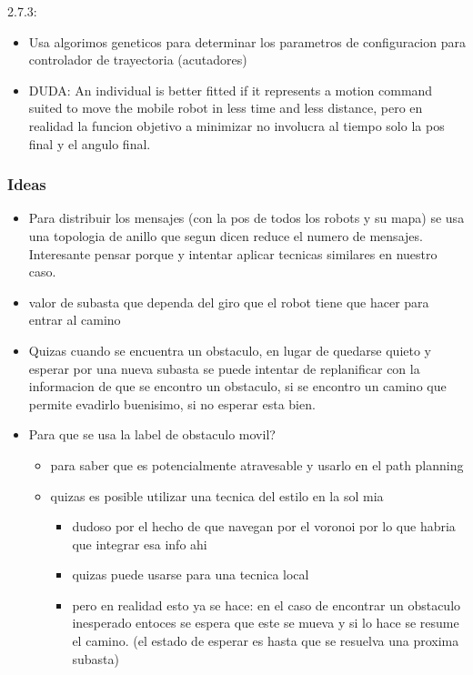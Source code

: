 2.7.3:
\begin{itemize}
\item Usa algorimos geneticos para determinar los parametros de configuracion para controlador de trayectoria (acutadores)
\item DUDA: An individual is better fitted if it represents a motion command suited to move the mobile robot in less time and less distance, pero en realidad la funcion objetivo a minimizar no involucra al tiempo solo la pos final y el angulo final.
\end{itemize}


\subsubsection{Ideas}
\begin{itemize}
\item Para distribuir los mensajes (con la pos de todos los robots y su mapa) se usa una topologia de anillo que segun dicen reduce el numero de mensajes. Interesante pensar porque y intentar aplicar tecnicas similares en nuestro caso.

\item valor de subasta que dependa del giro que el robot tiene que hacer para entrar al camino

\item Quizas cuando se encuentra un obstaculo, en lugar de quedarse quieto y esperar por una nueva subasta se puede intentar de replanificar con la informacion de que se encontro un obstaculo, si se encontro un camino que permite evadirlo buenisimo, si no esperar esta bien.

\item Para que se usa la label de obstaculo movil?
\begin{itemize}
  \item para saber que es potencialmente atravesable y usarlo en el path planning
  \item quizas es posible utilizar una tecnica del estilo en la sol mia
  \begin{itemize}
    \item dudoso por el hecho de que navegan por el voronoi por lo que habria que integrar esa info ahi
    \item quizas puede usarse para una tecnica local 
    \item pero en realidad esto ya se hace: en el caso de encontrar un obstaculo inesperado entoces se espera que este se mueva y si lo hace se resume el camino. (el estado de esperar es hasta que se resuelva una proxima subasta)
  \end{itemize}
\end{itemize}


\end{itemize}
